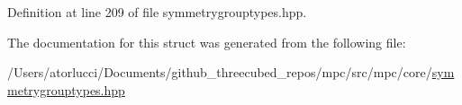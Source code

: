 Definition at line 209 of file symmetrygrouptypes.\+hpp.



The documentation for this struct was generated from the following file\+:\begin{DoxyCompactItemize}
\item 
/\+Users/atorlucci/\+Documents/github\+\_\+threecubed\+\_\+repos/mpc/src/mpc/core/\mbox{\hyperlink{symmetrygrouptypes_8hpp}{symmetrygrouptypes.\+hpp}}\end{DoxyCompactItemize}
